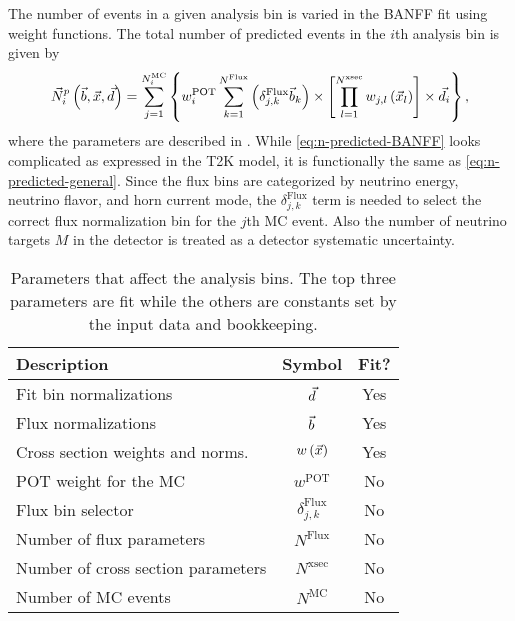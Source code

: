 The number of events in a given analysis bin is varied in the BANFF
fit using weight functions. The total number of predicted events in
the $i$th analysis bin is given by
\begin{equation}
\vec{N}_{i}^{p}\left(\vec{b},\vec{x},\vec{d}\right)=\sum_{j=1}^{N_{i}^{\text{MC}}}\left\{ w_{i}^{\text{POT}}\sum_{k=1}^{N^{\text{Flux}}}\left(\delta_{j,k}^{\text{Flux}}\vec{b}_{k}\right)\times\left[\prod_{l=1}^{N^{\text{xsec}}}w_{j,l}\left(\vec{x}_{l}\right)\right]\times\vec{d}_{i}\right\} ,\label{eq:n-predicted-BANFF}
\end{equation}
where the parameters are described in .
While \eqref{eq:n-predicted-BANFF} looks complicated as expressed
in the T2K model, it is functionally the same as \eqref{eq:n-predicted-general}.
Since the flux bins are categorized by neutrino energy, neutrino flavor,
and horn current mode, the $\delta_{j,k}^{\text{Flux}}$ term is needed
to select the correct flux normalization bin for the $j$th MC event.
Also the number of neutrino targets $M$ in the detector is treated
as a detector systematic uncertainty.

\begin{table}
\caption[Parameters that Affect the Analysis Bins]{Parameters that affect the analysis bins. The top three parameters
are fit while the others are constants set by the input data and bookkeeping.
\label{tab:Parameters-to-calculate}}

\centering{}%
\begin{tabular}{lcc}
\toprule 
Description & Symbol & Fit?\tabularnewline
\midrule
\midrule 
Fit bin normalizations & $\vec{d}$ & Yes\tabularnewline
Flux normalizations & $\vec{b}$ & Yes\tabularnewline
Cross section weights and norms. & $w\left(\vec{x}\right)$ & Yes\tabularnewline
POT weight for the MC & $w^{\text{POT}}$ & No\tabularnewline
Flux bin selector & $\delta_{j,k}^{\text{Flux}}$ & No\tabularnewline
Number of flux parameters & $N^{\text{Flux}}$ & No\tabularnewline
Number of cross section parameters & $N^{\text{xsec}}$ & No\tabularnewline
Number of MC events & $N^{\text{MC}}$ & No\tabularnewline
\bottomrule
\end{tabular}
\end{table}

